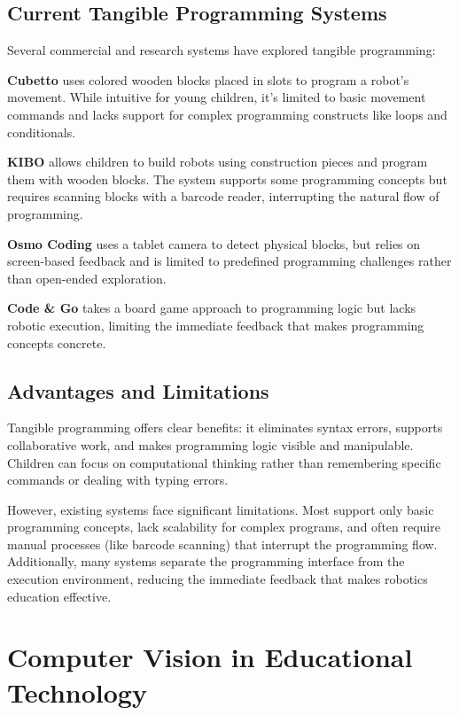 \subsection{Current Tangible Programming Systems}

Several commercial and research systems have explored tangible programming:

\textbf{Cubetto} uses colored wooden blocks placed in slots to program a robot's movement. While intuitive for young children, it's limited to basic movement commands and lacks support for complex programming constructs like loops and conditionals.

\textbf{KIBO} allows children to build robots using construction pieces and program them with wooden blocks. The system supports some programming concepts but requires scanning blocks with a barcode reader, interrupting the natural flow of programming.

\textbf{Osmo Coding} uses a tablet camera to detect physical blocks, but relies on screen-based feedback and is limited to predefined programming challenges rather than open-ended exploration.

\textbf{Code \& Go} takes a board game approach to programming logic but lacks robotic execution, limiting the immediate feedback that makes programming concepts concrete.

\subsection{Advantages and Limitations}

Tangible programming offers clear benefits: it eliminates syntax errors, supports collaborative work, and makes programming logic visible and manipulable. Children can focus on computational thinking rather than remembering specific commands or dealing with typing errors.

However, existing systems face significant limitations. Most support only basic programming concepts, lack scalability for complex programs, and often require manual processes (like barcode scanning) that interrupt the programming flow. Additionally, many systems separate the programming interface from the execution environment, reducing the immediate feedback that makes robotics education effective.

\section{Computer Vision in Educational Technology}

